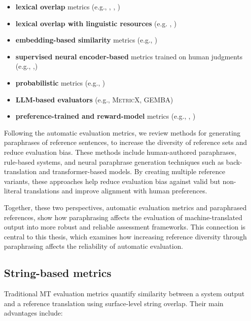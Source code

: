 \begin{itemize}
    \item \textbf{lexical overlap} metrics (e.g., \bleu, \ter, \chrf)
    \item \textbf{lexical overlap with linguistic resources} (e.g. \mn, \terp)
    \item \textbf{embedding-based similarity} metrics (e.g., \bertscore)
    \item \textbf{supervised neural encoder-based} metrics trained on human judgments (e.g., \comet,\bleurt)
    \item \textbf{probabilistic} metrics (e.g., \prism)
    \item \textbf{LLM-based evaluators} (e.g., \textsc{MetricX}, \textsc{GEMBA})
    \item \textbf{preference-trained and reward-model} metrics (e.g., \mtranker, \remedy)
\end{itemize}

Following the automatic evaluation metrics, we review methods for generating paraphrases of reference sentences, to increase the diversity of reference sets and reduce evaluation bias. These methods include human-authored paraphrases, rule-based systems, and neural paraphrase generation techniques such as back-translation and transformer-based models. By creating multiple reference variants, these approaches help reduce evaluation bias against valid but non-literal translations and improve alignment with human preferences.

Together, these two perspectives, automatic evaluation metrics and paraphrased references, show how paraphrasing affects the evaluation of machine-translated output into more robust and reliable assessment frameworks. This connection is central to this thesis, which examines how increasing reference diversity through paraphrasing affects the reliability of automatic evaluation.

\subsection{String-based metrics}
Traditional MT evaluation metrics quantify similarity between a system output and a reference translation using surface-level string overlap. Their main advantages include:

